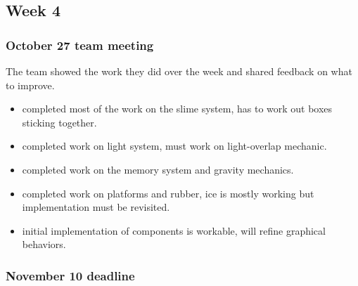 \subsection{Week 4}

\subsubsection{October 27 team meeting}
The team showed the work they did over the week and shared feedback on what to improve.
\begin{itemize}
    \item[Andrea Ruben:] completed most of the work on the slime system, has to work out boxes sticking together.
    \item[Christian:] completed work on light system, must work on light-overlap mechanic.
    \item[Shaan:] completed work on the memory system and gravity mechanics.
    \item[Matteo:] completed work on platforms and rubber, ice is mostly working but implementation must be revisited.
    \item[Andrea Coscia:] initial implementation of components is workable, will refine graphical behaviors.
\end{itemize}

\subsubsection{November 10 deadline}
